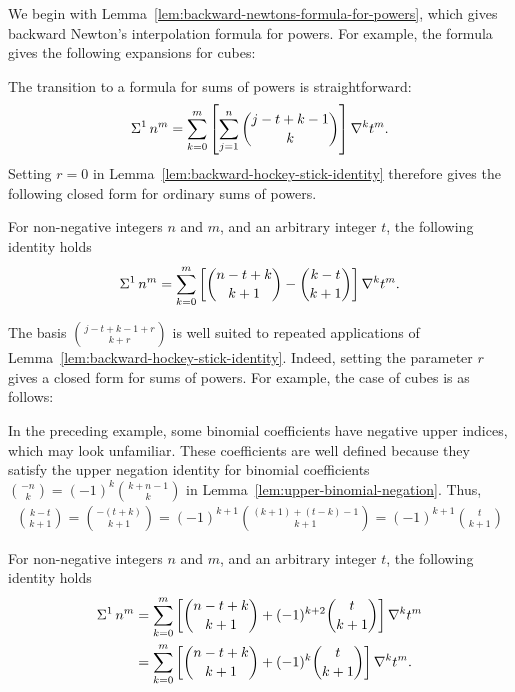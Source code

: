 We begin with Lemma~\eqref{lem:backward-newtons-formula-for-powers},
which gives backward Newton's interpolation formula for powers.
For example, the formula gives the following expansions for cubes:

The transition to a formula for sums of powers is straightforward:
\begin{align*}
  \Sigma^{1}\,{n}^{m}
  = \sum_{k=0}^{m} \left[ \sum_{j=1}^{n} \binom{j-t+k-1}{k} \right] \nabla^{k} t^m.
\end{align*}
Setting $r=0$ in Lemma~\eqref{lem:backward-hockey-stick-identity}
therefore gives the following closed form for ordinary sums of powers.
\begin{proposition}
  \label{prop:ordinary-sums-of-powers}
  For non-negative integers $n$ and $m$, and an arbitrary integer $t$, the following identity holds
  \begin{align*}
    \Sigma^{1}\,{n}^{m}
    = \sum_{k=0}^{m}
    \left[
      \binom{n-t+k}{k+1} - \binom{k-t}{k+1}
    \right] \nabla^{k} t^m.
  \end{align*}
\end{proposition}
The basis $\binom{j-t+k-1+r}{k+r}$ is well suited to repeated
applications of Lemma~\eqref{lem:backward-hockey-stick-identity}.
Indeed, setting the parameter $r$ gives a closed form for sums of powers.
For example, the case of cubes is as follows:

In the preceding example, some binomial coefficients have negative upper
indices, which may look unfamiliar.
These coefficients are well defined because they satisfy
the upper negation identity for binomial coefficients
$\binom{-n}{k} = (-1)^{k} \binom{k+n-1}{k}$
in Lemma~\eqref{lem:upper-binomial-negation}.
Thus,
\begin{align*}
  \binom{k-t}{k+1} = \binom{-(t+k)}{k+1}
  = (-1)^{k+1} \binom{(k+1)+(t-k)-1}{k+1}
  = (-1)^{k+1} \binom{t}{k+1}
\end{align*}
\begin{corollary}
  \label{cor:ordinary-sums-of-powers-upper-negation}
  For non-negative integers $n$ and $m$, and an arbitrary integer $t$, the following identity holds
  \begin{align*}
    \Sigma^{1}\,{n}^{m}
    &= \sum_{k=0}^{m}
    \left[
      \binom{n-t+k}{k+1} + (-1)^{k+2} \binom{t}{k+1}
    \right] \nabla^{k} t^m
    \\
    &= \sum_{k=0}^{m}
    \left[
      \binom{n-t+k}{k+1} + (-1)^{k} \binom{t}{k+1}
    \right] \nabla^{k} t^m.
  \end{align*}
\end{corollary}
